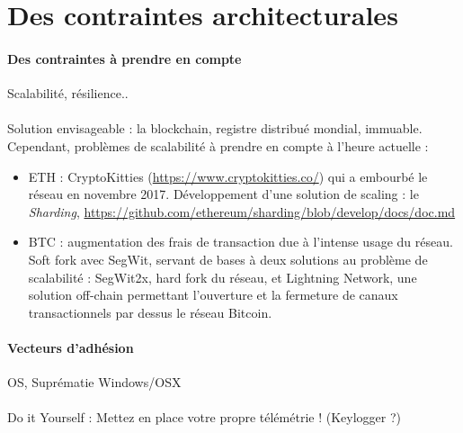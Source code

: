 \section{Des contraintes architecturales}

\paragraph{Des contraintes à prendre en compte} Scalabilité, résilience..

\paragraph{} Solution envisageable : la blockchain, registre distribué mondial, immuable. Cependant, problèmes de scalabilité
à prendre en compte à l'heure actuelle :

\begin{itemize}
    \item ETH : CryptoKitties (\url{https://www.cryptokitties.co/}) qui a embourbé le réseau en novembre 2017. 
    Développement d'une solution de scaling : le \emph{Sharding}, \url{https://github.com/ethereum/sharding/blob/develop/docs/doc.md}
    \item BTC : augmentation des frais de transaction due à l'intense usage du réseau.
    Soft fork avec SegWit, servant de bases à deux solutions au problème de scalabilité : SegWit2x, hard fork du réseau,
    et Lightning Network, une solution off-chain permettant l'ouverture et la fermeture de canaux transactionnels par dessus
    le réseau Bitcoin.
\end{itemize}

\paragraph{Vecteurs d'adhésion} OS, Suprématie Windows/OSX

\paragraph{} Do it Yourself : Mettez en place votre propre télémétrie ! (Keylogger ?)
